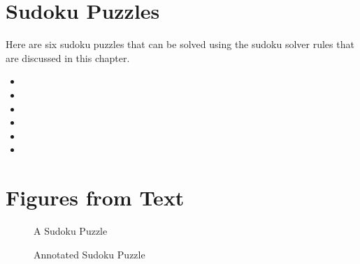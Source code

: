 \documentclass[letterpaper,10pt,english]{sphinxmanual}
\begin{document}
\begin{sphinxVerbatim}[commandchars=\\\{\},numbers=left,firstnumber=1,stepnumber=1]
    
       
        \PYG{p}{[}\PYG{p}{]}
        
   
\end{sphinxVerbatim}


\section{Sudoku Puzzles}
\label{\detokenize{chap5/chap5:sudoku-puzzles}}
Here are six sudoku puzzles that can be solved using the sudoku solver rules that are discussed in this chapter.
\begin{itemize}
\item {} 

\item {} 

\item {} 

\item {} 

\item {} 

\item {} 

\end{itemize}


\section{Figures from Text}
\label{\detokenize{chap5/chap5:figures-from-text}}
\begin{figure}[htbp]
\centering
\capstart

\noindent{}
\caption{A Sudoku Puzzle}\label{\detokenize{chap5/chap5:id1}}\end{figure}

\begin{figure}[htbp]
\centering
\capstart

\noindent{}
\caption{Annotated Sudoku Puzzle}\label{\detokenize{chap5/chap5:id2}}\end{figure}
\end{document}
